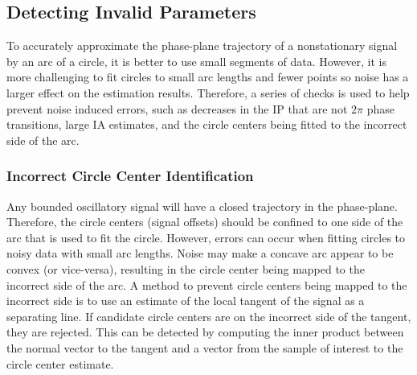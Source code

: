 \documentclass[a4paper]{IEEEtran}
\begin{document}

\subsection{Detecting Invalid Parameters}\label{sect:DetectingInvalidParameters}
To accurately approximate the phase-plane trajectory of a nonstationary signal by an arc of a circle, it is better to use small segments of data. However, it is more challenging to fit circles to small arc lengths and fewer points so noise has a larger effect on the estimation results. Therefore, a series of checks is used to help prevent noise induced errors, such as decreases in the IP that are not $2\pi$ phase transitions, large IA estimates, and the circle centers being fitted to the incorrect side of the arc. 

\subsubsection{Incorrect Circle Center Identification}
Any bounded oscillatory signal will have a closed trajectory in the phase-plane. Therefore, the circle centers (signal offsets) should be confined to one side of the arc that is used to fit the circle. However, errors can occur when fitting circles to noisy data with small arc lengths. Noise may make a concave arc appear to be convex (or vice-versa), resulting in the circle center being mapped to the incorrect side of the arc. A method to prevent circle centers being mapped to the incorrect side is to use an estimate of the local tangent of the signal as a separating line. If candidate circle centers are on the incorrect side of the tangent, they are rejected. This can be detected by computing the inner product between the normal vector to the tangent and a vector from the sample of interest to the circle center estimate. 
\end{document}
